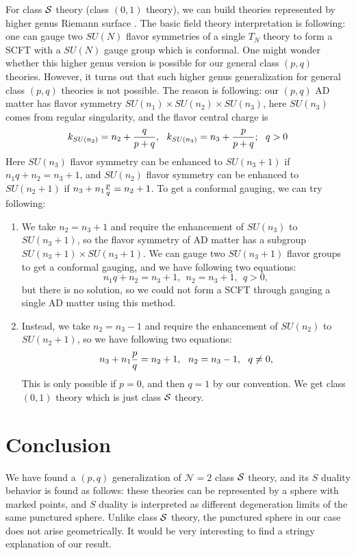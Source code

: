 \documentclass[a4paper,11pt]{article}
\begin{document}
For class ${\cal S}$ theory (class $(0,1)$ theory), we 
can build theories represented by higher genus Riemann surface \cite{Gaiotto:2009we}. The basic field theory interpretation is following:
one can gauge two $SU(N)$ flavor symmetries of a single $T_N$ theory to form a SCFT with a $SU(N)$ gauge group which is conformal.  One might wonder whether this higher genus version is possible for our general class $(p,q)$ theories. 
 However, it turns out that such higher genus generalization for general class $(p,q)$ theories is not possible. 
The reason is following: our $(p,q)$ AD matter has flavor symmetry $SU(n_1)\times SU(n_2)\times SU(n_3)$, here $SU(n_3)$ comes from regular singularity, and the flavor 
central charge is 
\begin{equation}
k_{SU(n_2)}=n_2+{q\over p+q},~~k_{SU(n_3)} =n_3+{p\over p+q};~~q> 0
\end{equation}
Here $SU(n_3)$ flavor symmetry can be enhanced to $SU(n_3+1)$ if $n_1q+n_2 =n_3+1$, and  $SU(n_2)$ flavor 
symmetry can be enhanced to $SU(n_2+1)$ if $n_3+n_1{p\over q}=n_2+1$.
To get a conformal gauging, we can try following:
\begin{enumerate}
\item We take $n_2=n_3+1$ and require the enhancement of $SU(n_3)$ to $SU(n_3+1)$, so the flavor symmetry of 
AD matter has a subgroup $SU(n_3+1)\times SU(n_3+1)$. We can gauge two $SU(n_3+1)$ flavor groups to 
get a conformal gauging, and we have  following two equations:
\begin{equation}
n_1q+n_2  =n_3+1,~~n_2=n_3+1,~~q> 0,
\end{equation}
but there is no solution, so we could not form a SCFT through gauging a single AD matter using this method.

\item Instead, we take $n_2=n_3-1$ and require the enhancement of $SU(n_2)$ to $SU(n_2+1)$, so we have following two equations:
\begin{equation}
n_3+n_1{p\over q}  =n_2+1,~~n_2=n_3-1,~~q\neq 0,
\end{equation}
This is only possible if $p=0$, and then $q=1$ by our convention. We get class $(0,1)$ theory which is just class ${\cal S}$ theory. 
\end{enumerate}



\section{Conclusion}
We have found a  $(p,q)$ generalization of $\mathcal{N}=2$ class ${\cal S}$ theory, and its $S$ duality behavior is found as follows: these
theories can be represented by a sphere with marked points, and $S$ duality is interpreted as different 
degeneration limits of the same punctured sphere.  Unlike class ${\cal S}$ theory, the punctured sphere in our 
case does not arise geometrically. It would be very interesting to find a stringy explanation of our result. 
\end{document}
